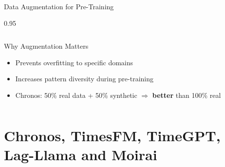 \documentclass[9pt, aspectratio=169, t]{beamer}
\begin{document}
\begin{frame}{Data Augmentation for Pre-Training}
\begin{cminipage}{0.95\textwidth}
\begin{columns}[T]
        \begin{alertblock}{Why Augmentation Matters}
            {\scriptsize
            \begin{itemize}\setlength{\itemsep}{0pt}
                \item Prevents overfitting to specific domains
                \item Increases pattern diversity during pre-training
                \item Chronos: 50\% real data + 50\% synthetic $\Rightarrow$ \textbf{better} than 100\% real
            \end{itemize}
            }
        \end{alertblock}
    \end{columns}
    \end{cminipage}
\end{frame}

\section{Chronos, TimesFM, TimeGPT, Lag-Llama and Moirai}
\end{document}
